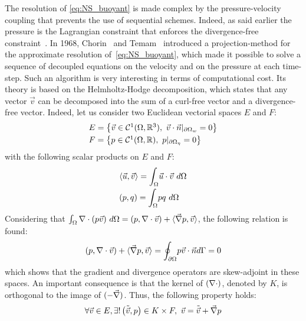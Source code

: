 The resolution of \eqref{eq:NS_buoyant} is made complex by the pressure-velocity coupling that prevents the use of sequential schemes.
Indeed, as said earlier the pressure is the Lagrangian constraint that enforces the divergence-free constraint~\cite{Aris1962}.
In 1968, Chorin~\cite{Chorin1968} and Temam~\cite{Temam1968} introduced a projection-method for the approximate resolution of~\eqref{eq:NS_buoyant}, which made it
possible to solve a sequence of decoupled equations on the velocity and on the pressure at each time-step.
Such an algorithm is very interesting in terms of computational cost.
Its theory is based on the Helmholtz-Hodge decomposition, which states that any vector $\vec v$ can be decomposed into the sum of a curl-free vector and a divergence-free vector.
Indeed, let us consider two Euclidean vectorial spaces $E$ and $F$:
\begin{equation}
  \begin{array}{l}
    E = \left\{ \vec{v} \in \mathcal{C}^1(\Omega, \mathbb R^3), ~ \vec v \cdot \vec n|_{\partial \Omega_w}=0\right\} \smallskip\\
    F = \left\{ p \in \mathcal{C}^1(\Omega, \mathbb R), ~ p|_{\partial \Omega_\eta}=0\right\} \\
  \end{array}
\end{equation}
with the following scalar products on $E$ and $F$:
\begin{equation}
  \begin{array}{l}
    \langle \vec u , \vec v \rangle = \displaystyle{\int_\Omega} \vec u \cdot \vec v~d\Omega \smallskip\\
    (p,q) = \displaystyle{\int_\Omega} pq~d\Omega
  \end{array}
\end{equation}
Considering that $\int_\Omega \nabla \cdot (p\vec v)~d\Omega = (p, \nabla \cdot \vec v) + \langle \vec \nabla p , \vec v \rangle$, the following relation is found:
\begin{equation}
  (p, \nabla \cdot \vec v) + \langle \vec \nabla p , \vec v \rangle = \displaystyle{\oint_{\partial \Omega}}p \vec v \cdot \vec n d\Gamma = 0
\end{equation}
which shows that the gradient and divergence operators are skew-adjoint in these spaces.
An important consequence is that the kernel of $(\nabla \cdot)$, denoted by $K$, is orthogonal to the image of $(-\vec \nabla)$.
Thus, the following property holds:
\begin{equation}
  \forall \vec v \in E, \exists ! \left(\tilde {\vec{v}}, p \right) \in K \times F, ~ \vec v = \tilde {\vec{v}} + \vec \nabla p
\end{equation}
